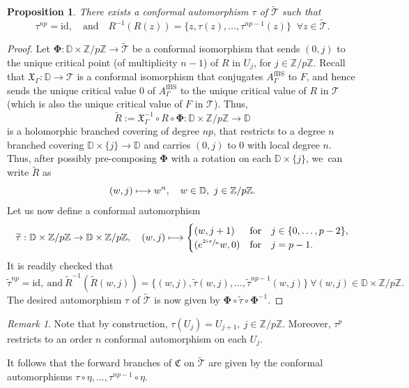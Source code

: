 \documentclass[JEP,XML,SOM,Unicode,NoFloatCountersInSection,published]{cedram}
\def\mto{\mathchoice{\longmapsto}{\mapsto}{\mapsto}{\mapsto}}
\newtheorem{proposition}[lemma]{Proposition}
\theoremstyle{definition}
\theoremstyle{remark}
\newtheorem{remark}[lemma]{Remark}
\newcommand{\D}{\mathbb{D}}
\newcommand{\Z}{\mathbb{Z}}
\newcommand{\cT}{\mathcal{T}}
\begin{document}
\begin{proposition}\label{deck_prop}
There exists a conformal automorphism $\tau$ of $\widetilde{\mathcal{T}}$ such that
\[
\tau^{np}=\mathrm{id},\quad \text{and}\quad R^{-1}(R(z))=\{z,\tau(z),\dots,\tau^{np-1}(z)\}\;\; \forall z\in \widetilde{\mathcal{T}}.
\]
\end{proposition}
\begin{proof}
Let $\pmb{\Phi}:\D\times\Z/p\Z\to\widetilde{\cT}$ be a conformal isomorphism that sends $(0,j)$ to the unique critical point (of multiplicity $n-1$) of $R$ in $U_j$, for $j\in\Z/p\Z$. Recall that $\mathfrak{X}_\Gamma:\D\to\cT$ is a conformal isomorphism that conjugates $A_{\Gamma}^{\mathrm{fBS}}$ to $F$, and hence sends the unique critical value $0$ of $A_{\Gamma}^{\mathrm{fBS}}$ to the unique critical value of $R$ in $\cT$ (which is also the unique critical value of $F$ in $\cT$). Thus,
\[
\widetilde{R}:=\mathfrak{X}_\Gamma^{-1}\circ R\circ\pmb{\Phi}:\D\times\Z/p\Z\to\D
\]
is a holomorphic branched covering of degree $np$, that restricts to a degree $n$ branched covering $\D\times\{j\}\to\D$ and carries $(0,j)$ to $0$ with local degree $n$. Thus, after possibly pre-composing $\pmb{\Phi}$ with a rotation on each $\D\times\{j\}$, we~can write $\widetilde{R}$ as
\[
(w,j)\mto w^n,\quad w\in\D,\ j\in\Z/p\Z.
\]
Let us now define a conformal automorphism
\[
\widetilde{\tau}:\D\times\Z/p\Z\to \D\times\Z/p\Z,\quad (w,j)\mto
\begin{cases}
(w,j+1)& \mathrm{for}\quad j\in \{0,\dots,p-2\},\\
(e^{\sfrac{2i\pi}{n}} w, 0)& \mathrm{for}\quad j=p-1.
\end{cases}
\]
It is readily checked that
\[
\widetilde{\tau}^{np}=\mathrm{id},\ \text{and}\ \widetilde{R}^{-1}(\widetilde{R}(w,j))=\{(w,j),\widetilde{\tau}(w,j),\dots,\widetilde{\tau}^{np-1}(w,j)\}\ \forall (w,j)\in \D\times\Z/p\Z.
\]
The desired automorphism $\tau$ of $\widetilde{\cT}$ is now given by $\pmb{\Phi}\circ\widetilde{\tau}\circ\pmb{\Phi}^{-1}$.
\end{proof}

\begin{remark}
Note that by construction, $\tau(U_j)=U_{j+1},\ j\in\Z/p\Z$. Moreover, $\tau^p$ restricts to an order $n$ conformal automorphism on each $U_j$.
\end{remark}

It follows that the forward branches of $\mathfrak{C}$ on $\widetilde{\mathcal{T}}$ are given by the conformal automorphisms $\tau\circ\eta,\dots,\tau^{np-1}\circ\eta$.
\end{document}
